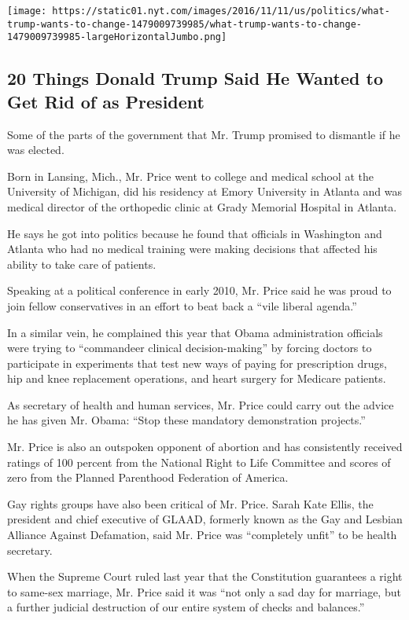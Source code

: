 \texttt{[image: https://static01.nyt.com/images/2016/11/11/us/politics/what-trump-wants-to-change-1479009739985/what-trump-wants-to-change-1479009739985-largeHorizontalJumbo.png]}

\hypertarget{20-things-donald-trump-said-he-wanted-to-get-rid-of-as-president}{%
\subsection{20 Things Donald Trump Said He Wanted to Get Rid of as
President}\label{20-things-donald-trump-said-he-wanted-to-get-rid-of-as-president}}

Some of the parts of the government that Mr. Trump promised to dismantle
if he was elected.

Born in Lansing, Mich., Mr. Price went to college and medical school at
the University of Michigan, did his residency at Emory University in
Atlanta and was medical director of the orthopedic clinic at Grady
Memorial Hospital in Atlanta.

He says he got into politics because he found that officials in
Washington and Atlanta who had no medical training were making decisions
that affected his ability to take care of patients.

Speaking at a political conference in early 2010, Mr. Price said he was
proud to join fellow conservatives in an effort to beat back a ``vile
liberal agenda.''

In a similar vein, he complained this year that Obama administration
officials were trying to ``commandeer clinical decision-making'' by
forcing doctors to participate in experiments that test new ways of
paying for prescription drugs, hip and knee replacement operations, and
heart surgery for Medicare patients.

As secretary of health and human services, Mr. Price could carry out the
advice he has given Mr. Obama: ``Stop these mandatory demonstration
projects.''

Mr. Price is also an outspoken opponent of abortion and has consistently
received ratings of 100 percent from the National Right to Life
Committee and scores of zero from the Planned Parenthood Federation of
America.

Gay rights groups have also been critical of Mr. Price. Sarah Kate
Ellis, the president and chief executive of GLAAD, formerly known as the
Gay and Lesbian Alliance Against Defamation, said Mr. Price was
``completely unfit'' to be health secretary.

When the Supreme Court ruled last year that the Constitution guarantees
a right to same-sex marriage, Mr. Price said it was ``not only a sad day
for marriage, but a further judicial destruction of our entire system of
checks and balances.''

